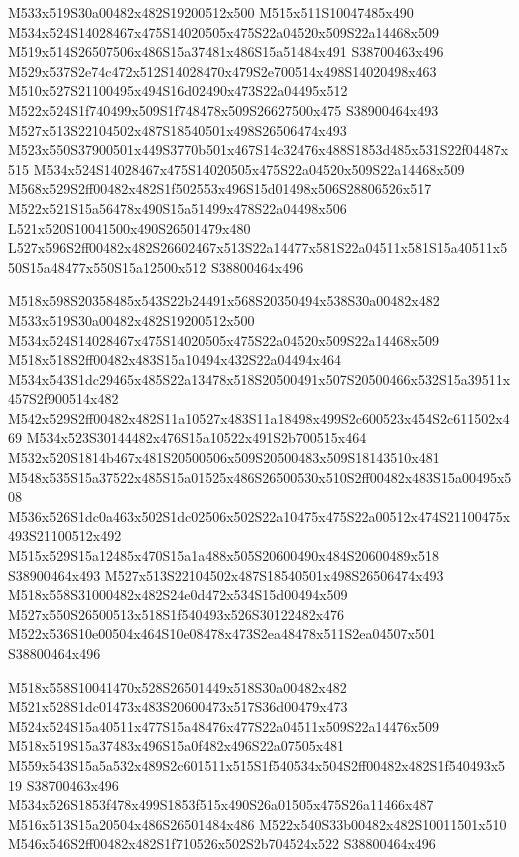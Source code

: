 \documentclass{article}
\begin{document}
\begin{multicols}{2}
M533x519S30a00482x482S19200512x500 M515x511S10047485x490 M534x524S14028467x475S14020505x475S22a04520x509S22a14468x509 M519x514S26507506x486S15a37481x486S15a51484x491 S38700463x496 M529x537S2e74c472x512S14028470x479S2e700514x498S14020498x463 M510x527S21100495x494S16d02490x473S22a04495x512 M522x524S1f740499x509S1f748478x509S26627500x475 S38900464x493 M527x513S22104502x487S18540501x498S26506474x493 M523x550S37900501x449S3770b501x467S14c32476x488S1853d485x531S22f04487x515 M534x524S14028467x475S14020505x475S22a04520x509S22a14468x509 M568x529S2ff00482x482S1f502553x496S15d01498x506S28806526x517 M522x521S15a56478x490S15a51499x478S22a04498x506 L521x520S10041500x490S26501479x480 L527x596S2ff00482x482S26602467x513S22a14477x581S22a04511x581S15a40511x550S15a48477x550S15a12500x512 S38800464x496

M518x598S20358485x543S22b24491x568S20350494x538S30a00482x482 M533x519S30a00482x482S19200512x500 M534x524S14028467x475S14020505x475S22a04520x509S22a14468x509 M518x518S2ff00482x483S15a10494x432S22a04494x464 M534x543S1dc29465x485S22a13478x518S20500491x507S20500466x532S15a39511x457S2f900514x482 M542x529S2ff00482x482S11a10527x483S11a18498x499S2c600523x454S2c611502x469 M534x523S30144482x476S15a10522x491S2b700515x464 M532x520S1814b467x481S20500506x509S20500483x509S18143510x481 M548x535S15a37522x485S15a01525x486S26500530x510S2ff00482x483S15a00495x508 M536x526S1dc0a463x502S1dc02506x502S22a10475x475S22a00512x474S21100475x493S21100512x492 M515x529S15a12485x470S15a1a488x505S20600490x484S20600489x518 S38900464x493 M527x513S22104502x487S18540501x498S26506474x493 M518x558S31000482x482S24e0d472x534S15d00494x509 M527x550S26500513x518S1f540493x526S30122482x476 M522x536S10e00504x464S10e08478x473S2ea48478x511S2ea04507x501 S38800464x496

M518x558S10041470x528S26501449x518S30a00482x482 M521x528S1dc01473x483S20600473x517S36d00479x473 M524x524S15a40511x477S15a48476x477S22a04511x509S22a14476x509 M518x519S15a37483x496S15a0f482x496S22a07505x481 M559x543S15a5a532x489S2c601511x515S1f540534x504S2ff00482x482S1f540493x519 S38700463x496 M534x526S1853f478x499S1853f515x490S26a01505x475S26a11466x487 M516x513S15a20504x486S26501484x486 M522x540S33b00482x482S10011501x510 M546x546S2ff00482x482S1f710526x502S2b704524x522 S38800464x496


\end{multicols}
\end{document}
